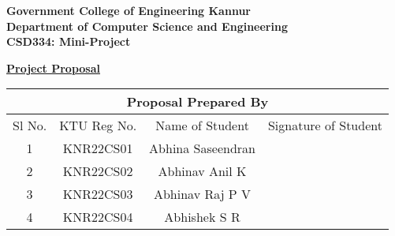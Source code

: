 \documentclass[14pt]{article}
\begin{document}
\begin{center}
\large{\textbf{Government College of Engineering Kannur\\}}
\large{\textbf{Department of Computer Science and Engineering\\}}
\large{\textbf{CSD334: Mini-Project\\}}
\end{center}

\begin{center}
\small{\textbf{\underline{ Project Proposal}\\}}
\end{center}

\begin{table}[ht!]
\begin{center}
\begin{tabular}{|cccc|}
\hline
\multicolumn{4}{|c|}{\textbf{Proposal Prepared By}}                        \\ \hline
\multicolumn{1}{|c|}{Sl No.} & \multicolumn{1}{c|}{KTU Reg No.} & \multicolumn{1}{c|}{Name of Student}              & Signature of Student \\ \hline
\multicolumn{1}{|c|}{1}      & \multicolumn{1}{c|}{KNR22CS01}   & \multicolumn{1}{c|}{Abhina Saseendran} &           \\ \hline
\multicolumn{1}{|c|}{2} & \multicolumn{1}{c|}{KNR22CS02} & \multicolumn{1}{c|}{Abhinav Anil K} &  \\ \hline
\multicolumn{1}{|c|}{3} & \multicolumn{1}{c|}{KNR22CS03} & \multicolumn{1}{c|}{Abhinav Raj P V} &  \\ \hline
\multicolumn{1}{|c|}{4} & \multicolumn{1}{c|}{KNR22CS04} & \multicolumn{1}{c|}{Abhishek S R} &  \\ \hline
\end{tabular}
\end{center}
\end{table}
\end{document}
